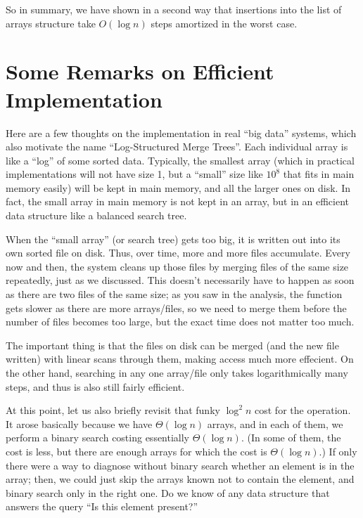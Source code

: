 So in summary, we have shown in a second way that insertions into the
list of arrays structure take $O(\log n)$ steps amortized in the worst
case.

\section{Some Remarks on Efficient Implementation}
Here are a few thoughts on the implementation in real ``big data''
systems, which also motivate the name ``Log-Structured Merge Trees''.
Each individual array is like a ``log'' of some sorted data.
Typically, the smallest array (which in practical implementations will
not have size 1, but a ``small'' size like $10^{8}$ that fits in main
memory easily) will be kept in main memory, and all the larger ones on
disk. In fact, the small array in main memory is not kept in an array,
but in an efficient data structure like a balanced search tree.

When the ``small array'' (or search tree) gets too big, it is written
out into its own sorted file on disk. Thus, over time, more and more
files accumulate. Every now and then, the system cleans up those files
by merging files of the same size repeatedly, just as we discussed.
This doesn't necessarily have to happen as soon as there are two files
of the same size; as you saw in the analysis, the  function
gets slower as there are more arrays/files, so we need to merge them
before the number of files becomes too large, but the exact time does
not matter too much.

The important thing is that the files on disk can be merged (and the
new file written) with linear scans through them, making access much
more effecient. On the other hand, searching in any one array/file
only takes logarithmically many steps, and thus is also still fairly
efficient.

\smallskip

At this point, let us also briefly revisit that funky $\log^2 n$ cost
for the  operation. It arose basically because we have 
$\Theta(\log n)$ arrays, and in each of them, we perform a binary search
costing essentially $\Theta(\log n)$. (In some of them, the cost is
less, but there are enough arrays for which the cost is $\Theta(\log n)$.)
If only there were a way to diagnose without binary search whether an
element is in the array; then, we could just skip the arrays known not
to contain the element, and binary search only in the right one.
Do we know of any data structure that answers the query 
``Is this element present?''

